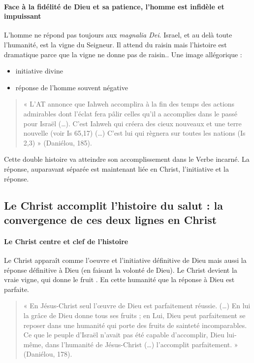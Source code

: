 \paragraph{Face à la fidélité de Dieu et sa patience, l'homme est infidèle et impuissant} L'homme ne répond pas toujours aux \textit{magnalia Dei}. Israel, et au delà toute l'humanité, est la vigne du Seigneur. Il attend du raisin mais l'histoire est dramatique parce que la vigne ne donne pas de raisin..  Une image allégorique :
\begin{itemize}
    \item initiative divine
    \item réponse de l'homme souvent négative
\end{itemize}


\begin{quote}
    « L’AT annonce que Iahweh accomplira à la fin des temps des actions admirables dont l’éclat fera pâlir celles qu’il a accomplies dans le passé pour Israël (…). C’est Iahweh qui créera des cieux nouveaux et une terre nouvelle (voir Is 65,17) (…) C’est lui qui règnera sur toutes les nations (Is 2,3) » (Daniélou, 185).  
\end{quote}
Cette double histoire va atteindre son accomplissement dans le Verbe incarné. La réponse, auparavant séparée est maintenant liée en Christ, l'initiative et la réponse.

\subsection{Le Christ accomplit l’histoire du salut : la convergence de ces deux lignes en Christ }

\paragraph{Le Christ centre et clef de l’histoire } Le Christ apparaît comme l'oeuvre et l'initiative définitive de Dieu mais aussi la réponse définitive à Dieu (en faisant la volonté de Dieu). Le Christ devient la vraie vigne, qui donne le fruit . En cette humanité que la réponse à Dieu est parfaite.
\begin{quote}
    « En Jésus-Christ seul l’œuvre de Dieu est parfaitement réussie.  (…) En lui la grâce de Dieu donne tous ses fruits ; en Lui, Dieu peut parfaitement se reposer dans une humanité qui porte des fruits de sainteté incomparables. Ce que le peuple d’Israël n’avait pas été capable d’accomplir, Dieu lui-même, dans l’humanité de Jésus-Christ (…) l’accomplit parfaitement. » (Daniélou, 178). 
\end{quote}

